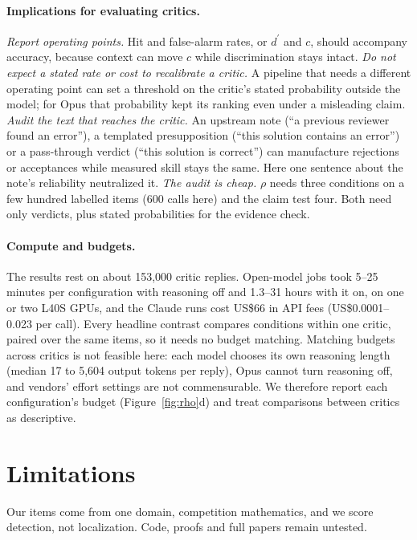\documentclass[letterpaper]{article} %
\newcommand{\dprime}{d^{\prime}}
\begin{document}
\paragraph{Implications for evaluating critics.} \emph{Report operating points.} Hit and false-alarm rates, or $\dprime$ and $c$, should accompany accuracy, because context can move $c$ while discrimination stays intact. \emph{Do not expect a stated rate or cost to recalibrate a critic.} A pipeline that needs a different operating point can set a threshold on the critic's stated probability outside the model; for Opus that probability kept its ranking even under a misleading claim. \emph{Audit the text that reaches the critic.} An upstream note (``a previous reviewer found an error''), a templated presupposition (``this solution contains an error'') or a pass-through verdict (``this solution is correct'') can manufacture rejections or acceptances while measured skill stays the same. Here one sentence about the note's reliability neutralized it. \emph{The audit is cheap.} $\rho$ needs three conditions on a few hundred labelled items (600 calls here) and the claim test four. Both need only verdicts, plus stated probabilities for the evidence check.

\paragraph{Compute and budgets.} The results rest on about 153,000 critic replies. Open-model jobs took 5--25 minutes per configuration with reasoning off and 1.3--31 hours with it on, on one or two L40S GPUs, and the Claude runs cost US\$66 in API fees (US\$0.0001--0.023 per call). Every headline contrast compares conditions within one critic, paired over the same items, so it needs no budget matching. Matching budgets across critics is not feasible here: each model chooses its own reasoning length (median 17 to 5,604 output tokens per reply), Opus cannot turn reasoning off, and vendors' effort settings are not commensurable. We therefore report each configuration's budget (Figure~\ref{fig:rho}d) and treat comparisons between critics as descriptive.

\section{Limitations}

Our items come from one domain, competition mathematics, and we score detection, not localization. Code, proofs and full papers remain untested.
\end{document}
